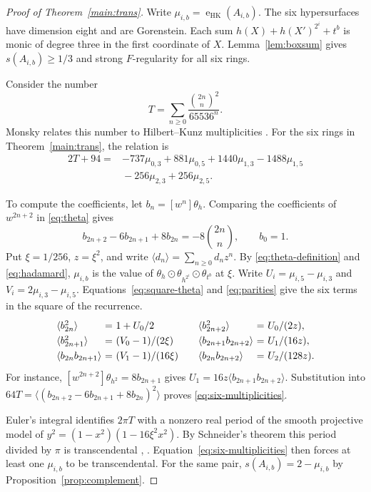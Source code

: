 \documentclass[11pt,a4paper,reqno]{amsart}
\numberwithin{equation}{section}
\theoremstyle{plain}
\newcommand{\eHK}{\operatorname{e}_{\mathrm{HK}}}
\begin{document}
\begin{proof}[Proof of Theorem~\ref{main:trans}]
Write $\mu_{i,b}=\eHK(A_{i,b})$. The six hypersurfaces have dimension eight and are Gorenstein. Each sum $h(X)+h(X')^{2^i}+t^b$ is monic of degree three in the first coordinate of $X$. Lemma~\ref{lem:boxsum} gives $s(A_{i,b})\ge1/3$ and strong $F$-regularity for all six rings.

Consider the number
\[
 T=\sum_{n\ge0}\frac{\binom{2n}{n}^2}{65536^n}.
\]
Monsky relates this number to Hilbert--Kunz multiplicities \cite[Theorems~1.10 and~2.2]{Mtrans}. For the six rings in Theorem~\ref{main:trans}, the relation is
\begin{equation}\label{eq:six-multiplicities}
 \begin{split}
 2T+94={}&-737\mu_{0,3}+881\mu_{0,5}
        +1440\mu_{1,3}-1488\mu_{1,5}\\
        &{}-256\mu_{2,3}+256\mu_{2,5}.
 \end{split}
\end{equation}

To compute the coefficients, let $b_n=[w^n]\theta_h$. Comparing the coefficients of $w^{2n+2}$ in \eqref{eq:theta} gives
\[
 b_{2n+2}-6b_{2n+1}+8b_{2n}=-8\binom{2n}{n},\qquad b_0=1 .
\]
Put $\xi=1/256$, $z=\xi^2$, and write $\langle d_n\rangle=\sum_{n\ge0}d_n z^n$. By \eqref{eq:theta-definition} and \eqref{eq:hadamard}, $\mu_{i,b}$ is the value of $\theta_h\odot\theta_{h^{2^i}}\odot\theta_{t^b}$ at $\xi$. Write $U_i=\mu_{i,5}-\mu_{i,3}$ and $V_i=2\mu_{i,3}-\mu_{i,5}$. Equations~\eqref{eq:square-theta} and \eqref{eq:parities} give the six terms in the square of the recurrence.
\[
\renewcommand{\arraystretch}{1.25}
\begin{array}{l@{\ }c@{\ }l@{\qquad}l@{\ }c@{\ }l}
 \langle b_{2n}^2\rangle&=&1+U_0/2&
 \langle b_{2n+2}^2\rangle&=&U_0/(2z),\\
 \langle b_{2n+1}^2\rangle&=&(V_0-1)/(2\xi)&
 \langle b_{2n+1}b_{2n+2}\rangle&=&U_1/(16z),\\
 \langle b_{2n}b_{2n+1}\rangle&=&(V_1-1)/(16\xi)&
 \langle b_{2n}b_{2n+2}\rangle&=&U_2/(128z).
\end{array}
\]
For instance, $[w^{2n+2}]\theta_{h^2}=8b_{2n+1}$ gives $U_1=16z\langle b_{2n+1}b_{2n+2}\rangle$. Substitution into $64T=\langle(b_{2n+2}-6b_{2n+1}+8b_{2n})^2\rangle$ proves \eqref{eq:six-multiplicities}.

Euler's integral identifies $2\pi T$ with a nonzero real period of the smooth projective model of $y^2=(1-x^2)(1-16\xi^2x^2)$. By Schneider's theorem this period divided by $\pi$ is transcendental \cite{Schneider}, \cite[Lemma~2.4 and Theorem~2.5]{Mtrans}. Equation~\eqref{eq:six-multiplicities} then forces at least one $\mu_{i,b}$ to be transcendental. For the same pair, $s(A_{i,b})=2-\mu_{i,b}$ by Proposition~\ref{prop:complement}.
\end{proof}
\end{document}

